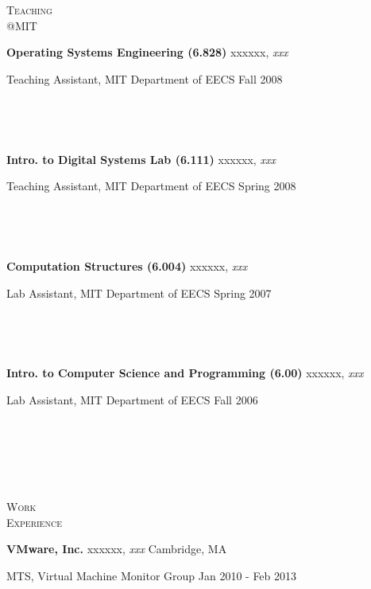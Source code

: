 \documentclass[10pt,times]{report}
\newlength{\sectiongap}
\newlength{\entrygap}
\newlength{\sectioncolwidth}
\newlength{\colgap}
\newlength{\stuffwidth}
\def\ifEqString#1#2{\def\testa{#1}\def\testb{#2}%
  \ifx\testa\testb}
\newenvironment{rtable}{
  \begin{minipage}{\textwidth}
  }{
  \end{minipage}
}
\newenvironment{rentry}[3][xxx]{
  \begin{minipage}[t]{\hsize}
    \textbf{#2}\ifEqString{#1}{xxx}\relax\else, \textit{#1}\fi
    \hspace{\stretch{1}} #3 \\
  }{
    \removelastskip
  \end{minipage}
  \\[\entrygap]  %
}
\newcommand{\rline}[2]{
  \begin{minipage}[t]{\hsize}
    #1 \hspace{\stretch{1}} #2
  \end{minipage} \\
}
\newenvironment{rsection}[1]{
  \begin{minipage}[t]{\sectioncolwidth}
    \textsc{#1}
  \end{minipage}
  \hspace{\colgap}
  \begin{minipage}[t]{\stuffwidth}
  }{
    \removelastskip
  \end{minipage}
  \\[\sectiongap]
}
\begin{document}
\begin{rtable}
  \vspace{1.0em}
  \begin{rsection}{Teaching\\@MIT}
    \begin{rentry}{Operating Systems Engineering (6.828)}{}
      \rline{Teaching Assistant, MIT Department of EECS}{Fall
        2008} 
      \vspace{-0.5em}
    \end{rentry}
    \begin{rentry}{Intro. to Digital Systems Lab (6.111)}{}
      \rline{Teaching Assistant, MIT Department of EECS}{Spring
        2008} 
      \vspace{-0.5em}
    \end{rentry}
    \begin{rentry}{Computation Structures (6.004)}{}
      \rline{Lab Assistant, MIT Department of EECS}{Spring 2007}
      \vspace{-0.5em}
    \end{rentry}
    \begin{rentry}{Intro. to Computer Science and
        Programming (6.00)}{}
      \rline{Lab Assistant, MIT Department of EECS}{Fall 2006}
      \vspace{-0.5em}
    \end{rentry}
  \end{rsection}
  \begin{rsection}{Work\\Experience}
    \begin{rentry}{VMware, Inc.}{Cambridge, MA}      
      \rline{MTS, Virtual Machine Monitor
        Group}{Jan 2010 - Feb 2013}
      \vspace{-.5em}
    \end{rentry}

\end{rsection}
\end{rtable}
\end{document}
